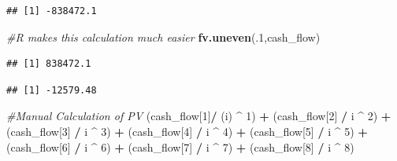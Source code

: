 \documentclass[]{article}
\newenvironment{Shaded}{\begin{snugshade}}{\end{snugshade}}
\newcommand{\CommentTok}[1]{\textcolor[rgb]{0.56,0.35,0.01}{\textit{#1}}}
\newcommand{\DataTypeTok}[1]{\textcolor[rgb]{0.13,0.29,0.53}{#1}}
\newcommand{\DecValTok}[1]{\textcolor[rgb]{0.00,0.00,0.81}{#1}}
\newcommand{\KeywordTok}[1]{\textcolor[rgb]{0.13,0.29,0.53}{\textbf{#1}}}
\newcommand{\NormalTok}[1]{#1}
\newcommand{\OperatorTok}[1]{\textcolor[rgb]{0.81,0.36,0.00}{\textbf{#1}}}
\newcommand{\StringTok}[1]{\textcolor[rgb]{0.31,0.60,0.02}{#1}}
\begin{document}
\begin{verbatim}
## [1] -838472.1
\end{verbatim}

\begin{Shaded}
\begin{Highlighting}[]
\CommentTok{#R makes this calculation much easier}
\KeywordTok{fv.uneven}\NormalTok{(.}\DecValTok{1}\NormalTok{,cash_flow)}
\end{Highlighting}
\end{Shaded}

\begin{verbatim}
## [1] 838472.1
\end{verbatim}

\begin{Shaded}
\end{Shaded}

\begin{verbatim}
## [1] -12579.48
\end{verbatim}

\begin{Shaded}
\begin{Highlighting}[]
 \CommentTok{#Manual Calculation of PV}
\NormalTok{ (cash_flow[}\DecValTok{1}\NormalTok{]}\OperatorTok{/}\StringTok{ }\NormalTok{(i) }\OperatorTok{^}\StringTok{ }\DecValTok{1}\NormalTok{) }\OperatorTok{+}\StringTok{ }\NormalTok{(cash_flow[}\DecValTok{2}\NormalTok{] }\OperatorTok{/}\StringTok{ }\NormalTok{i }\OperatorTok{^}\StringTok{ }\DecValTok{2}\NormalTok{)  }\OperatorTok{+}\StringTok{  }\NormalTok{(cash_flow[}\DecValTok{3}\NormalTok{] }\OperatorTok{/}\StringTok{ }\NormalTok{i }\OperatorTok{^}\StringTok{ }\DecValTok{3}\NormalTok{) }\OperatorTok{+}\StringTok{ }\NormalTok{(cash_flow[}\DecValTok{4}\NormalTok{] }\OperatorTok{/}\StringTok{ }\NormalTok{i }\OperatorTok{^}\StringTok{ }\DecValTok{4}\NormalTok{) }\OperatorTok{+}\StringTok{ }\NormalTok{(cash_flow[}\DecValTok{5}\NormalTok{] }\OperatorTok{/}\StringTok{ }\NormalTok{i }\OperatorTok{^}\StringTok{ }\DecValTok{5}\NormalTok{) }\OperatorTok{+}\StringTok{ }\NormalTok{(cash_flow[}\DecValTok{6}\NormalTok{] }\OperatorTok{/}\StringTok{ }\NormalTok{i }\OperatorTok{^}\StringTok{ }\DecValTok{6}\NormalTok{) }\OperatorTok{+}\StringTok{ }\NormalTok{(cash_flow[}\DecValTok{7}\NormalTok{] }\OperatorTok{/}\StringTok{ }\NormalTok{i }\OperatorTok{^}\StringTok{ }\DecValTok{7}\NormalTok{) }\OperatorTok{+}\StringTok{ }\NormalTok{(cash_flow[}\DecValTok{8}\NormalTok{]}
 \OperatorTok{/}\StringTok{ }\NormalTok{i }\OperatorTok{^}\StringTok{ }\DecValTok{8}\NormalTok{)}
\end{Highlighting}
\end{Shaded}
\end{document}
